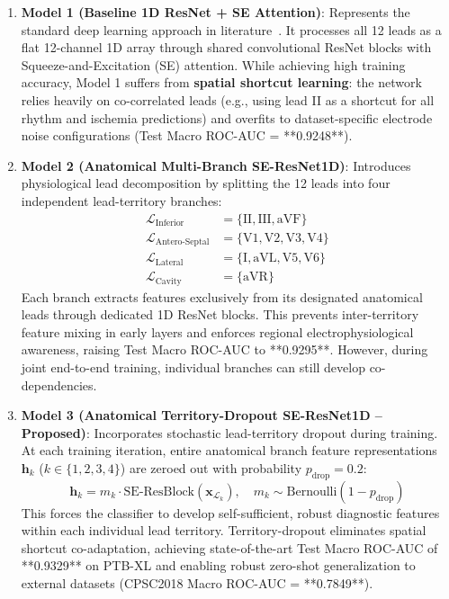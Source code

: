 \documentclass[5p,twocolumn,10pt]{elsarticle}
\begin{document}
\begin{enumerate}
    \item \textbf{Model 1 (Baseline 1D ResNet + SE Attention)}: Represents the standard deep learning approach in literature~\cite{strodthoff2020deep}. It processes all 12 leads as a flat 12-channel 1D array through shared convolutional ResNet blocks with Squeeze-and-Excitation (SE) attention. While achieving high training accuracy, Model 1 suffers from \textbf{spatial shortcut learning}: the network relies heavily on co-correlated leads (e.g., using lead II as a shortcut for all rhythm and ischemia predictions) and overfits to dataset-specific electrode noise configurations (Test Macro ROC-AUC = **0.9248**).
    
    \item \textbf{Model 2 (Anatomical Multi-Branch SE-ResNet1D)}: Introduces physiological lead decomposition by splitting the 12 leads into four independent lead-territory branches:
    \begin{align}
    \mathcal{L}_{\text{Inferior}} &= \{\text{II}, \text{III}, \text{aVF}\} \\
    \mathcal{L}_{\text{Antero-Septal}} &= \{\text{V1}, \text{V2}, \text{V3}, \text{V4}\} \\
    \mathcal{L}_{\text{Lateral}} &= \{\text{I}, \text{aVL}, \text{V5}, \text{V6}\} \\
    \mathcal{L}_{\text{Cavity}} &= \{\text{aVR}\}
    \end{align}
    Each branch extracts features exclusively from its designated anatomical leads through dedicated 1D ResNet blocks. This prevents inter-territory feature mixing in early layers and enforces regional electrophysiological awareness, raising Test Macro ROC-AUC to **0.9295**. However, during joint end-to-end training, individual branches can still develop co-dependencies.
    
    \item \textbf{Model 3 (Anatomical Territory-Dropout SE-ResNet1D -- Proposed)}: Incorporates stochastic lead-territory dropout during training. At each training iteration, entire anatomical branch feature representations $\mathbf{h}_k$ ($k \in \{1, 2, 3, 4\}$) are zeroed out with probability $p_{\text{drop}} = 0.2$:
    \begin{equation}
    \mathbf{h}_k = m_k \cdot \text{SE-ResBlock}(\mathbf{x}_{\mathcal{L}_k}), \quad m_k \sim \text{Bernoulli}(1 - p_{\text{drop}})
    \end{equation}
    This forces the classifier to develop self-sufficient, robust diagnostic features within each individual lead territory. Territory-dropout eliminates spatial shortcut co-adaptation, achieving state-of-the-art Test Macro ROC-AUC of **0.9329** on PTB-XL and enabling robust zero-shot generalization to external datasets (CPSC2018 Macro ROC-AUC = **0.7849**).
\end{enumerate}
\end{document}
